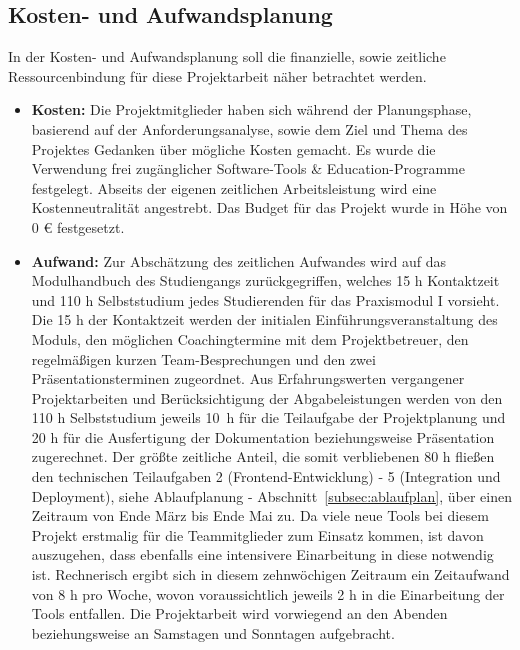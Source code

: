 \subsection{Kosten- und Aufwandsplanung}\label{subsec:Kosten-Aufwandsplanung}
In der Kosten- und Aufwandsplanung soll die finanzielle, sowie zeitliche Ressourcenbindung für diese Projektarbeit näher betrachtet werden.
\begin{itemize}[itemsep=1em, leftmargin=*]
    \item\textbf{Kosten:} Die Projektmitglieder haben sich während der Planungsphase, basierend auf der Anforderungsanalyse, sowie dem Ziel und Thema des Projektes Gedanken über mögliche Kosten gemacht.
    Es wurde die Verwendung frei zugänglicher Software-Tools \& Education-Programme festgelegt.
    Abseits der eigenen zeitlichen Arbeitsleistung wird eine Kostenneutralität angestrebt.
    Das Budget für das Projekt wurde in Höhe von 0 € festgesetzt.

    \item\textbf{Aufwand:} Zur Abschätzung des zeitlichen Aufwandes wird auf das Modulhandbuch des Studiengangs zurückgegriffen, welches 15 h Kontaktzeit und 110 h Selbststudium jedes Studierenden für das Praxismodul I vorsieht.
    Die 15 h der Kontaktzeit werden der initialen Einführungsveranstaltung des Moduls, den möglichen Coachingtermine mit dem Projektbetreuer, den regelmäßigen kurzen Team-Besprechungen und den zwei Präsentationsterminen zugeordnet.
    Aus Erfahrungswerten vergangener Projektarbeiten und Berücksichtigung der Abgabeleistungen werden von den 110 h Selbststudium jeweils 10~h für die Teilaufgabe der Projektplanung und 20 h für die Ausfertigung der Dokumentation beziehungsweise Präsentation zugerechnet.
    Der größte zeitliche Anteil, die somit verbliebenen 80 h fließen den technischen Teilaufgaben 2 (Frontend-Entwicklung) - 5 (Integration und Deployment), siehe Ablaufplanung - Abschnitt~\ref{subsec:ablaufplan}, über einen Zeitraum von Ende März bis Ende Mai zu.
    Da viele neue Tools bei diesem Projekt erstmalig für die Teammitglieder zum Einsatz kommen, ist davon auszugehen, dass ebenfalls eine intensivere Einarbeitung in diese notwendig ist.
    Rechnerisch ergibt sich in diesem zehnwöchigen Zeitraum ein Zeitaufwand von 8 h pro Woche, wovon voraussichtlich jeweils 2 h in die Einarbeitung der Tools entfallen.
    Die Projektarbeit wird vorwiegend an den Abenden beziehungsweise an Samstagen und Sonntagen aufgebracht.
\end{itemize}

